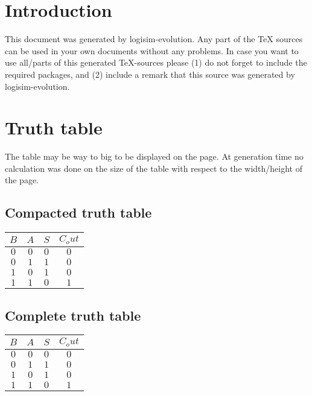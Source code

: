 \documentclass [15pt,a4paper,twoside]{article}
\begin{document}
\section{Introduction}
This document was generated by logisim-evolution. Any part of the TeX sources can be used in your own documents without any problems. In case you want to use all/parts of this generated TeX-sources please (1) do not forget to include the required packages, and (2) include a remark that this source was generated by logisim-evolution.
\section{Truth table}
The table may be way to big to be displayed on the page. At generation time no calculation was done on the size of the table with respect to the width/height of the page.
\subsection{Compacted truth table}
\begin{center}
\begin{tabular}{cc|cc}
$B$&$A$&$S$&$C_out$\\
\hline
$0$&$0$&$0$&$0$\\
$0$&$1$&$1$&$0$\\
$1$&$0$&$1$&$0$\\
$1$&$1$&$0$&$1$\\

\end{tabular}
\end{center}
\subsection{Complete truth table}
\begin{center}
\begin{tabular}{cc|cc}
$B$&$A$&$S$&$C_out$\\
\hline
$0$&$0$&$0$&$0$\\
$0$&$1$&$1$&$0$\\
$1$&$0$&$1$&$0$\\
$1$&$1$&$0$&$1$\\

\end{tabular}
\end{center}
\end{document}
